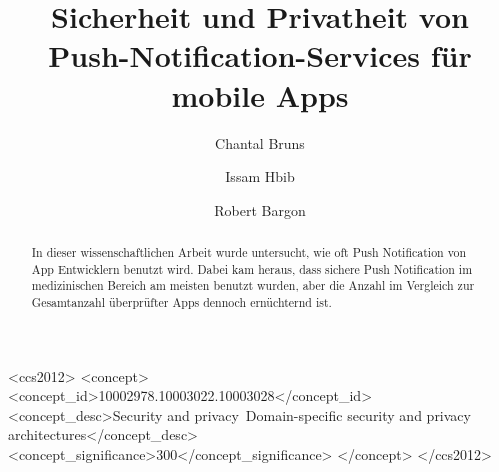 \documentclass[sigconf]{acmart}
\begin{document}
\title{Sicherheit und Privatheit von Push-Notification-Services für mobile Apps}

\author{Chantal Bruns}

\author{Issam Hbib}

\author{Robert Bargon}

\renewcommand{\shortauthors}{Bruns, Hbib, Bargon}

\begin{abstract}
  In dieser wissenschaftlichen Arbeit wurde untersucht, wie oft Push Notification von App Entwicklern benutzt wird.
  Dabei kam heraus, dass sichere Push Notification im medizinischen Bereich am meisten benutzt wurden, aber
  die Anzahl im Vergleich zur Gesamtanzahl überprüfter Apps dennoch ernüchternd ist.
\end{abstract}

\begin{CCSXML}
<ccs2012>
  <concept>
  <concept_id>10002978.10003022.10003028</concept_id>
  <concept_desc>Security and privacy~Domain-specific security and privacy architectures</concept_desc>
  <concept_significance>300</concept_significance>
  </concept>
</ccs2012>
\end{CCSXML}

\end{document}
